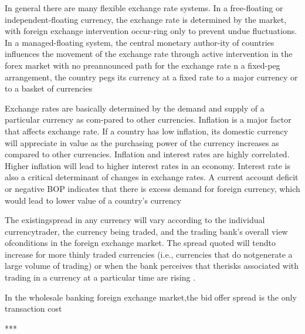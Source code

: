 In general there are many flexible exchange rate systems. In a free-floating or independent-floating currency,  the  exchange  rate  is  determined  by  the  market,  with  foreign  exchange  intervention  occur-ring only to prevent undue fluctuations. In a managed-floating system, the central monetary author-ity of countries influences the movement of the exchange rate through active intervention in the forex market with no preannounced path for the exchange rate n a fixed-peg arrangement, the country pegs its currency at a fixed rate to a major currency or to a basket of currencies \cite{book_forex}

Exchange rates are basically determined by the demand and supply of a particular currency as com-pared to other currencies. Inflation is a major factor that affects exchange rate. If a country has low inflation, its domestic currency will appreciate in value as the purchasing power of the currency increases as  compared  to  other  currencies.  Inflation  and  interest  rates  are  highly  correlated.  Higher  inflation  will lead to higher interest rates in an economy. Interest rate is also a critical determinant of changes in exchange rates. A current account deficit or negative BOP indicates that there is excess demand for foreign currency, which would lead to lower value of a country’s currency \cite{book_forex}

The existingspread in any currency will vary according to the individual currencytrader, the currency being traded, and the trading bank’s overall view ofconditions in the foreign exchange market. The spread quoted will tendto increase for more thinly traded currencies (i.e., currencies that do notgenerate a large volume of trading) or when the bank perceives that therisks associated with trading in a currency at a particular time are rising \cite{book_forex_2}.

In the wholesale banking foreign exchange market,the bidoffer spread is the only transaction cost \cite{book_forex_2}

***